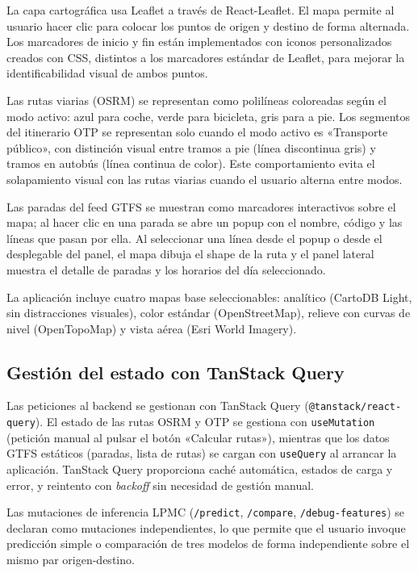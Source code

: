 La capa cartográfica usa Leaflet a través de React-Leaflet. El mapa permite al usuario hacer clic para colocar los puntos de origen y destino de forma alternada. Los marcadores de inicio y fin están implementados con iconos personalizados creados con CSS, distintos a los marcadores estándar de Leaflet, para mejorar la identificabilidad visual de ambos puntos.

Las rutas viarias (OSRM) se representan como polilíneas coloreadas según el modo activo: azul para coche, verde para bicicleta, gris para a pie. Los segmentos del itinerario OTP se representan solo cuando el modo activo es «Transporte público», con distinción visual entre tramos a pie (línea discontinua gris) y tramos en autobús (línea continua de color). Este comportamiento evita el solapamiento visual con las rutas viarias cuando el usuario alterna entre modos.

Las paradas del feed GTFS se muestran como marcadores interactivos sobre el mapa; al hacer clic en una parada se abre un popup con el nombre, código y las líneas que pasan por ella. Al seleccionar una línea desde el popup o desde el desplegable del panel, el mapa dibuja el shape de la ruta y el panel lateral muestra el detalle de paradas y los horarios del día seleccionado.

La aplicación incluye cuatro mapas base seleccionables: analítico (CartoDB Light, sin distracciones visuales), color estándar (OpenStreetMap), relieve con curvas de nivel (OpenTopoMap) y vista aérea (Esri World Imagery).

\subsection{Gestión del estado con TanStack Query}

Las peticiones al backend se gestionan con TanStack Query (\texttt{@tanstack/react-query}). El estado de las rutas OSRM y OTP se gestiona con \texttt{useMutation} (petición manual al pulsar el botón «Calcular rutas»), mientras que los datos GTFS estáticos (paradas, lista de rutas) se cargan con \texttt{useQuery} al arrancar la aplicación. TanStack Query proporciona caché automática, estados de carga y error, y reintento con \textit{backoff} sin necesidad de gestión manual.

Las mutaciones de inferencia LPMC (\texttt{/predict}, \texttt{/compare}, \texttt{/debug-features}) se declaran como mutaciones independientes, lo que permite que el usuario invoque predicción simple o comparación de tres modelos de forma independiente sobre el mismo par origen-destino.

